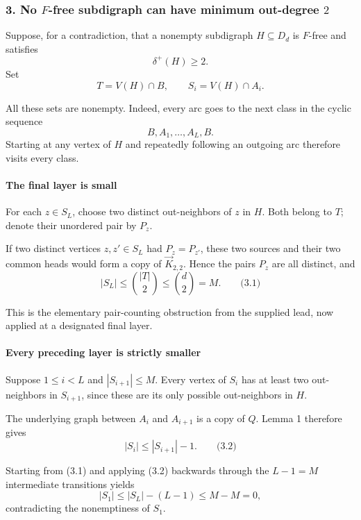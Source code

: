 \documentclass[
  11pt,
  a4paper,
]{article}
\newcounter{none} %
\begin{document}
\subsubsection{\texorpdfstring{3. No \(F\)-free subdigraph can have
minimum out-degree
\(2\)}{3. No F-free subdigraph can have minimum out-degree 2}}\label{no-f-free-subdigraph-can-have-minimum-out-degree-2}

Suppose, for a contradiction, that a nonempty subdigraph
\(H\subseteq D_d\) is \(F\)-free and satisfies \[
\delta^+(H)\ge2.
\] Set \[
T=V(H)\cap B,\qquad S_i=V(H)\cap A_i.
\]

All these sets are nonempty. Indeed, every arc goes to the next class in
the cyclic sequence \[
B,A_1,\ldots,A_L,B.
\] Starting at any vertex of \(H\) and repeatedly following an outgoing
arc therefore visits every class.

\paragraph{The final layer is small}\label{the-final-layer-is-small}

For each \(z\in S_L\), choose two distinct out-neighbors of \(z\) in
\(H\). Both belong to \(T\); denote their unordered pair by \(P_z\).

If two distinct vertices \(z,z'\in S_L\) had \(P_z=P_{z'}\), these two
sources and their two common heads would form a copy of
\(\vec K_{2,2}\). Hence the pairs \(P_z\) are all distinct, and \[
|S_L|
\le \binom{|T|}{2}
\le \binom d2
=M.
\qquad\text{(3.1)}
\]

This is the elementary pair-counting obstruction from the supplied lead,
now applied at a designated final layer.

\paragraph{Every preceding layer is strictly
smaller}\label{every-preceding-layer-is-strictly-smaller}

Suppose \(1\le i<L\) and \(|S_{i+1}|\le M\). Every vertex of \(S_i\) has
at least two out-neighbors in \(S_{i+1}\), since these are its only
possible out-neighbors in \(H\).

The underlying graph between \(A_i\) and \(A_{i+1}\) is a copy of \(Q\).
Lemma 1 therefore gives \[
|S_i|\le |S_{i+1}|-1.
\qquad\text{(3.2)}
\]

Starting from (3.1) and applying (3.2) backwards through the \(L-1=M\)
intermediate transitions yields \[
|S_1|
\le |S_L|-(L-1)
\le M-M
=0,
\] contradicting the nonemptiness of \(S_1\).
\end{document}
